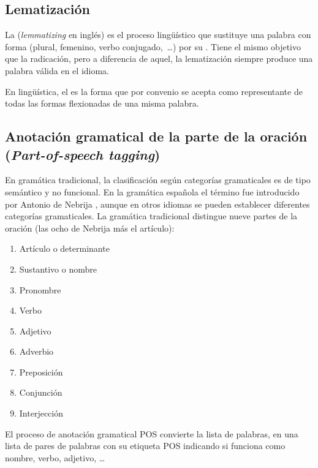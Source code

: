 \subsection{Lematización}

La  (\emph{lemmatizing} en inglés) es el proceso lingüístico que sustituye una palabra con forma  (plural, femenino, verbo conjugado,~\ldots) por su . Tiene el mismo objetivo que la radicación, pero a diferencia de aquel, la lematización siempre produce una palabra válida en el idioma.
\begin{definition}[Lema]
En lingüística, el  es la forma que por convenio se acepta como representante de todas las formas flexionadas de una misma palabra.
\end{definition}

\subsection{Anotación gramatical de la parte de la oración (\emph{Part-of-speech tagging}) }

En gramática tradicional, la clasificación según categorías gramaticales es de tipo semántico y no funcional. En la gramática española el término fue introducido por Antonio de Nebrija \citep[Categoría gramatical]{wikipedia-es}, aunque en otros idiomas se pueden establecer diferentes categorías gramaticales. La gramática tradicional distingue nueve partes de la oración (las ocho de Nebrija más el artículo):
\nopagebreak
\begin{enumerate}
\item Artículo o determinante
\item Sustantivo o nombre
\item Pronombre
\item Verbo
\item Adjetivo
\item Adverbio
\item Preposición
\item Conjunción
\item Interjección
\end{enumerate}

El proceso de anotación gramatical POS convierte la lista de palabras, en una lista de pares de palabras con su etiqueta POS indicando si funciona como nombre, verbo, adjetivo, \ldots

